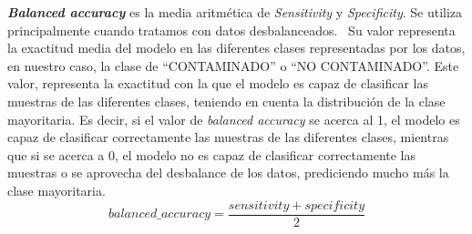 \textit{\textbf{Balanced accuracy}} es la media aritmética de \textit{Sensitivity} y \textit{Specificity}. Se utiliza principalmente cuando tratamos con datos desbalanceados.\ \cite{Balanced44:online} Su valor representa la exactitud media del modelo en las diferentes clases representadas por los datos, en nuestro caso, la clase de ``CONTAMINADO'' o ``NO CONTAMINADO''. Este valor, representa la exactitud con la que el modelo es capaz de clasificar las muestras de las diferentes clases, teniendo en cuenta la distribución de la clase mayoritaria. Es decir, si el valor de \textit{balanced accuracy} se acerca al 1, el modelo es capaz de clasificar correctamente las muestras de las diferentes clases, mientras que si se acerca a 0, el modelo no es capaz de clasificar correctamente las muestras o se aprovecha del desbalance de los datos, prediciendo mucho más la clase mayoritaria.
\begin{equation}
    balanced\_accuracy =\frac{sensitivity + specificity}{2}
\end{equation}
